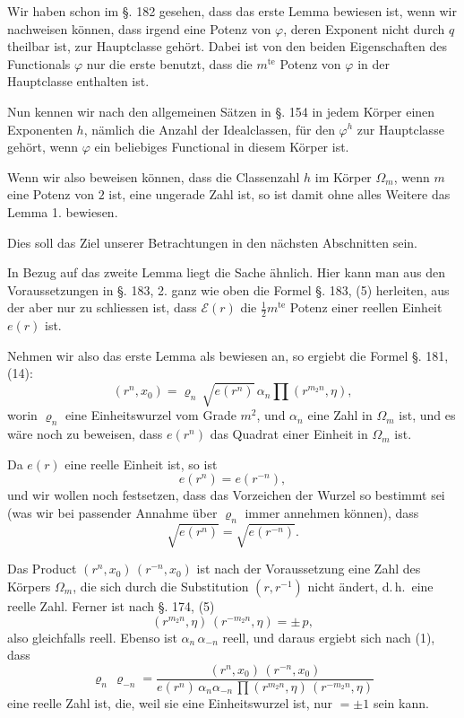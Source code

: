 \documentclass[12pt,a4paper]{article}
\begin{document}
Wir haben schon im \S. 182 gesehen, dass das erste Lemma bewiesen ist, wenn wir nachweisen können, dass irgend eine Potenz von $\varphi$, deren Exponent nicht durch $q$ theilbar ist, zur Hauptclasse gehört. Dabei ist von den beiden Eigenschaften des Functionals $\varphi$ nur die erste benutzt, dass die $m^{\text{te}}$ Potenz von $\varphi$ in der Hauptclasse enthalten ist.

Nun kennen wir nach den allgemeinen Sätzen in \S. 154 in jedem Körper einen Exponenten $h$, nämlich die Anzahl der Idealclassen, für den $\varphi^h$ zur Hauptclasse gehört, wenn $\varphi$ ein beliebiges Functional in diesem Körper ist.

Wenn wir also beweisen können, dass die Classenzahl $h$ im Körper $\Omega_m$, wenn $m$ eine Potenz von $2$ ist, eine ungerade Zahl ist, so ist damit ohne alles Weitere das Lemma 1. bewiesen.

Dies soll das Ziel unserer Betrachtungen in den nächsten Abschnitten sein.

In Bezug auf das zweite Lemma liegt die Sache ähnlich. Hier kann man aus den Voraussetzungen in \S. 183, 2. ganz wie oben die Formel \S. 183, (5) herleiten, aus der aber nur zu schliessen ist, dass $\mathcal{E}(r)$ die $\frac{1}{2}m^{\text{te}}$ Potenz einer reellen Einheit $e(r)$ ist.

Nehmen wir also das erste Lemma als bewiesen an, so ergiebt die Formel \S. 181, (14):
\begin{equation}\label{eq:184-1}
(r^n, x_0) = \varrho_n\,\sqrt{e(r^n)}\,\alpha_n \prod (r^{m_2 n}, \eta),
\end{equation}
worin $\varrho_n$ eine Einheitswurzel vom Grade $m^2$, und $\alpha_n$ eine Zahl in $\Omega_m$ ist, und es wäre noch zu beweisen, dass $e(r^n)$ das Quadrat einer Einheit in $\Omega_m$ ist.

Da $e(r)$ eine reelle Einheit ist, so ist
\begin{equation}\label{eq:184-2}
e(r^n) = e(r^{-n}),
\end{equation}
und wir wollen noch festsetzen, dass das Vorzeichen der Wurzel so bestimmt sei (was wir bei passender Annahme über $\varrho_n$ immer annehmen können), dass
\begin{equation}\label{eq:184-3}
\sqrt{e(r^n)} = \sqrt{e(r^{-n})}.
\end{equation}

Das Product $(r^n, x_0)\,(r^{-n}, x_0)$ ist nach der Voraussetzung eine Zahl des Körpers $\Omega_m$, die sich durch die Substitution $(r, r^{-1})$ nicht ändert, d.\,h.\ eine reelle Zahl. Ferner ist nach \S. 174, (5)
\[
(r^{m_2 n}, \eta)\,(r^{-m_2 n}, \eta) = \pm\,p,
\]
also gleichfalls reell. Ebenso ist $\alpha_n\,\alpha_{-n}$ reell, und daraus ergiebt sich nach (1), dass
\[
\varrho_n\,\varrho_{-n} = \frac{(r^n, x_0)\,(r^{-n}, x_0)}{e(r^n)\,\alpha_n\alpha_{-n}\,\prod(r^{m_2 n}, \eta)\,(r^{-m_2 n}, \eta)}
\]
eine reelle Zahl ist, die, weil sie eine Einheitswurzel ist, nur $= \pm 1$ sein kann.
\end{document}
